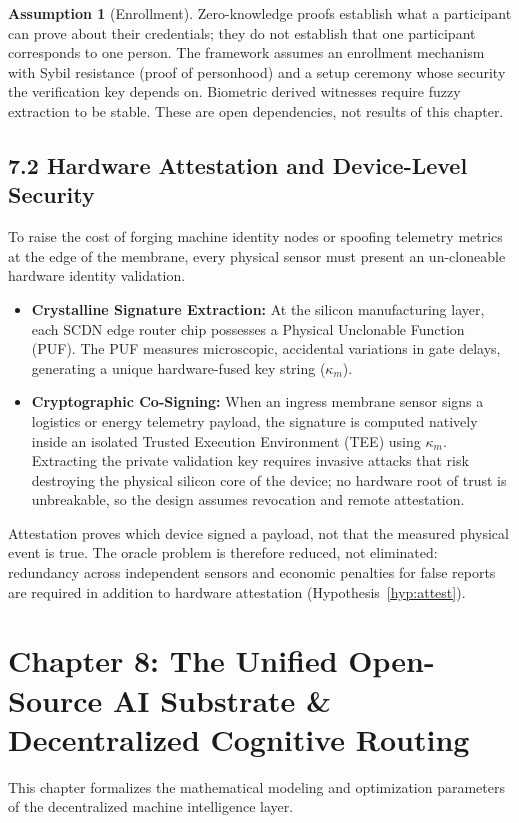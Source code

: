 \documentclass[11pt,a4paper]{article}
\theoremstyle{definition}
\newtheorem{assumption}{Assumption}
\theoremstyle{plain}
\theoremstyle{remark}
\begin{document}
\begin{assumption}[Enrollment]\label{ass:enroll}
Zero-knowledge proofs establish what a participant can prove about their credentials; they do not establish that one participant corresponds to one person. The framework assumes an enrollment mechanism with Sybil resistance (proof of personhood) and a setup ceremony whose security the verification key depends on. Biometric derived witnesses require fuzzy extraction to be stable. These are open dependencies, not results of this chapter.
\end{assumption}

\subsection*{7.2 Hardware Attestation and Device-Level Security}
To raise the cost of forging machine identity nodes or spoofing telemetry metrics at the edge of the membrane, every physical sensor must present an un-cloneable hardware identity validation.
\begin{itemize}
\item \textbf{Crystalline Signature Extraction:} At the silicon manufacturing layer, each SCDN edge router chip possesses a Physical Unclonable Function (PUF). The PUF measures microscopic, accidental variations in gate delays, generating a unique hardware-fused key string ($\kappa_m$).
\item \textbf{Cryptographic Co-Signing:} When an ingress membrane sensor signs a logistics or energy telemetry payload, the signature is computed natively inside an isolated Trusted Execution Environment (TEE) using $\kappa_m$. Extracting the private validation key requires invasive attacks that risk destroying the physical silicon core of the device; no hardware root of trust is unbreakable, so the design assumes revocation and remote attestation.
\end{itemize}
Attestation proves which device signed a payload, not that the measured physical event is true. The oracle problem is therefore reduced, not eliminated: redundancy across independent sensors and economic penalties for false reports are required in addition to hardware attestation (Hypothesis~\ref{hyp:attest}).

\clearpage
\clearpage
\section*{Chapter 8: The Unified Open-Source AI Substrate \& Decentralized Cognitive Routing}
This chapter formalizes the mathematical modeling and optimization parameters of the decentralized machine intelligence layer.
\end{document}
